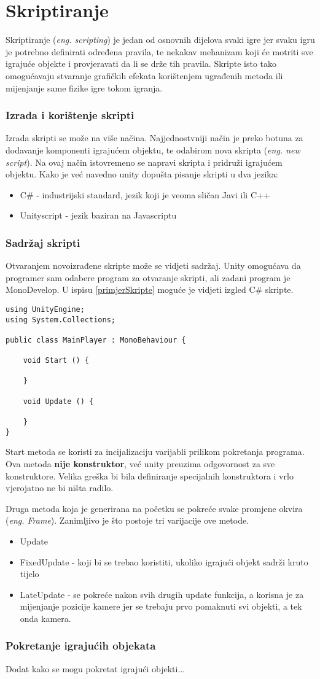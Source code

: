\section{Skriptiranje}
Skriptiranje (\emph{eng. scripting}) je jedan od osnovnih dijelova svaki igre jer svaku igru je potrebno definirati određena pravila, te nekakav mehanizam koji će motriti sve igrajuće objekte i provjeravati da li se drže tih pravila. Skripte isto tako omogućavaju stvaranje grafičkih efekata korištenjem ugrađenih metoda ili mijenjanje same fizike igre tokom igranja.
\subsubsection{Izrada i korištenje skripti}
Izrada skripti se može na više načina. Najjednostvniji način je preko botuna za dodavanje komponenti igrajućem objektu, te odabirom nova skripta (\emph{eng. new script}). Na ovaj način istovremeno se napravi skripta i pridruži igrajućem objektu. Kako je već navedno unity dopušta pisanje skripti u dva jezika:
\begin{itemize} 
	\item C\# - industrijski standard, jezik koji je veoma sličan Javi ili C++
	\item Unityscript - jezik baziran na Javascriptu
\end{itemize}
\subsubsection{Sadržaj skripti}
Otvaranjem novoizrađene skripte može se vidjeti sadržaj. Unity omogućava da programer sam odabere program za otvaranje skripti, ali zadani program je MonoDevelop. U ispisu \ref{primjerSkripte}  moguće je vidjeti izgled C\# skripte.

\begin{lstlisting}[caption={Primjer skripte}, label=primjerSkripte]
using UnityEngine;
using System.Collections;

public class MainPlayer : MonoBehaviour {

    void Start () {
    
    }
    
    void Update () {
    
    }
}
\end{lstlisting}
Start metoda se koristi za incijalizaciju varijabli prilikom pokretanja programa. Ova metoda \textbf{nije konstruktor}, već unity preuzima odgovornost za sve konstruktore. Velika greška bi bila definiranje specijalnih konstruktora i vrlo vjerojatno ne bi ništa radilo. \par
Druga metoda koja je generirana na početku se pokreće svake promjene okvira (\emph{eng. Frame}). Zanimljivo je što postoje tri varijacije ove metode.
\begin{itemize} 
	\item Update
	\item FixedUpdate - koji bi se trebao koristiti, ukoliko igrajući objekt sadrži kruto tijelo
	\item LateUpdate - se pokreće nakon svih drugih update funkcija, a korisna je za mijenjanje pozicije kamere jer se trebaju prvo pomaknuti svi objekti, a tek onda kamera. 
\end{itemize}
\subsubsection{Pokretanje igrajućih objekata}
Dodat kako se mogu pokretat igrajući objekti...